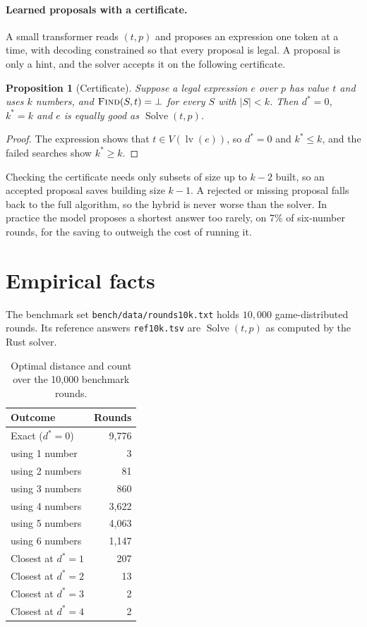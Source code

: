 \documentclass[11pt,a4paper]{article}
\newtheorem{proposition}[theorem]{Proposition}
\theoremstyle{definition}
\theoremstyle{remark}
\newcommand{\proc}[1]{\textnormal{\textsc{#1}}}
\newcommand{\leaves}{\operatorname{lv}}
\begin{document}
\paragraph{Learned proposals with a certificate.}
A small transformer reads $(t, p)$ and proposes an expression one token at a time, with decoding constrained so
that every proposal is legal. A proposal is only a hint, and the solver accepts it on the following
certificate.

\begin{proposition}[Certificate]\label{prop:certificate}
Suppose a legal expression $e$ over $p$ has value $t$ and uses $k$ numbers, and $\proc{Find}(S, t) = \bot$ for
every $S$ with $|S| < k$. Then $d^* = 0$, $k^* = k$ and $e$ is equally good as $\operatorname{Solve}(t, p)$.
\end{proposition}

\begin{proof}
The expression shows that $t \in V(\leaves(e))$, so $d^* = 0$ and $k^* \le k$, and the failed searches show
$k^* \ge k$.
\end{proof}

Checking the certificate needs only subsets of size up to $k - 2$ built, so an accepted proposal saves
building size $k - 1$. A rejected or missing proposal falls back to the full algorithm, so the hybrid is
never worse than the solver. In practice the model proposes a shortest answer too rarely, on 7\% of
six-number rounds, for the saving to outweigh the cost of running it.

\section{Empirical facts}\label{sec:data}

The benchmark set \texttt{bench/data/rounds10k.txt} holds $10{,}000$ game-distributed rounds. Its
reference answers \texttt{ref10k.tsv} are $\operatorname{Solve}(t, p)$ as computed by the Rust solver.

\begin{table}[ht]
\centering
\begin{tabular}{lr}
\toprule
Outcome & Rounds \\ \midrule
Exact ($d^* = 0$) & 9{,}776 \\
\quad using 1 number & 3 \\
\quad using 2 numbers & 81 \\
\quad using 3 numbers & 860 \\
\quad using 4 numbers & 3{,}622 \\
\quad using 5 numbers & 4{,}063 \\
\quad using 6 numbers & 1{,}147 \\
Closest at $d^* = 1$ & 207 \\
Closest at $d^* = 2$ & 13 \\
Closest at $d^* = 3$ & 2 \\
Closest at $d^* = 4$ & 2 \\ \bottomrule
\end{tabular}
\caption{Optimal distance and count over the 10{,}000 benchmark rounds.}
\end{table}
\end{document}
